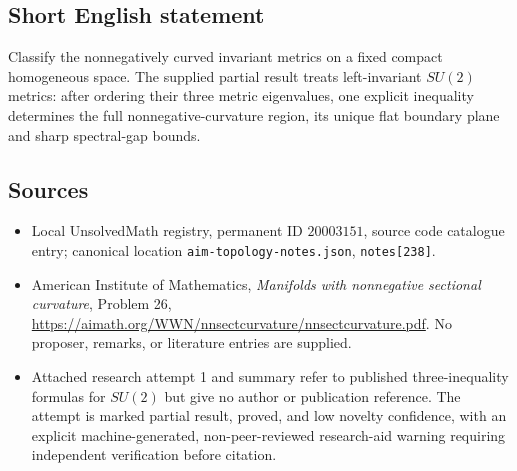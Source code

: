 \documentclass[11pt]{article}
\begin{document}
\subsection{Short English statement}
Classify the nonnegatively curved invariant metrics on a fixed compact homogeneous space. The supplied partial result treats left-invariant $SU(2)$ metrics: after ordering their three metric eigenvalues, one explicit inequality determines the full nonnegative-curvature region, its unique flat boundary plane and sharp spectral-gap bounds.
\subsection{Sources}
\begin{itemize}
\item Local UnsolvedMath registry, permanent ID $20003151$, source code catalogue entry; canonical location \texttt{aim-topology-notes.json}, \texttt{notes[238]}.
\item American Institute of Mathematics, \emph{Manifolds with nonnegative sectional curvature}, Problem 26, \url{https://aimath.org/WWN/nnsectcurvature/nnsectcurvature.pdf}. No proposer, remarks, or literature entries are supplied.
\item Attached research attempt 1 and summary refer to published three-inequality formulas for $SU(2)$ but give no author or publication reference. The attempt is marked partial result, proved, and low novelty confidence, with an explicit machine-generated, non-peer-reviewed research-aid warning requiring independent verification before citation.
\end{itemize}
\end{document}
